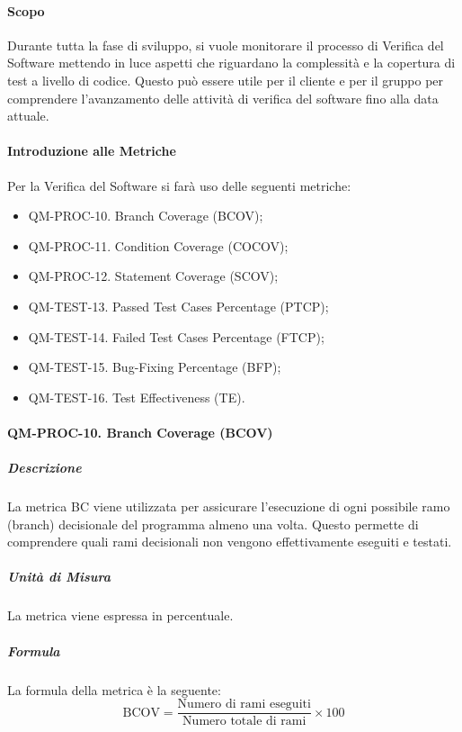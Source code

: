 		\paragraph{Scopo}

			Durante tutta la fase di sviluppo, si vuole monitorare il processo di Verifica del Software mettendo in luce aspetti che riguardano la complessità e la copertura di test a livello di codice. Questo può essere utile per il cliente e per il gruppo per comprendere l'avanzamento delle attività di verifica del software fino alla data attuale.

		\paragraph{Introduzione alle Metriche}

			Per la Verifica del Software si farà uso delle seguenti metriche:

			\begin{itemize}
				\item QM-PROC-10. Branch Coverage (BCOV);
				\item QM-PROC-11. Condition Coverage (COCOV);
				\item QM-PROC-12. Statement Coverage (SCOV);
				\item QM-TEST-13. Passed Test Cases Percentage (PTCP);
				\item QM-TEST-14. Failed Test Cases Percentage (FTCP);
				\item QM-TEST-15. Bug-Fixing Percentage (BFP);
				\item QM-TEST-16. Test Effectiveness (TE).
			\end{itemize}

		\paragraph{QM-PROC-10. Branch Coverage (BCOV)}

			\subparagraph{Descrizione}
			La metrica BC viene utilizzata per assicurare l'esecuzione di ogni possibile ramo (branch) decisionale del programma almeno una volta. Questo permette di comprendere quali rami decisionali non vengono effettivamente eseguiti e testati.

			\subparagraph{Unità di Misura}
			La metrica viene espressa in percentuale.

			\subparagraph{Formula}
			La formula della metrica è la seguente:
			\[
				\text{BCOV} = \frac{\text{Numero di rami eseguiti}}{\text{Numero totale di rami}} \times 100
			\]

